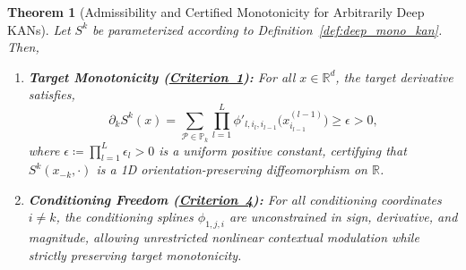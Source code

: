 \documentclass[11pt,a4paper]{article}
\theoremstyle{plain}
\newtheorem{theorem}{Theorem}[section]
\theoremstyle{definition}
\theoremstyle{remark}
\begin{document}
\begin{theorem}[Admissibility and Certified Monotonicity for Arbitrarily Deep KANs]
\label{thm:deep_kan_mono}
Let $S^k$ be parameterized according to Definition~\ref{def:deep_mono_kan}. Then,
\begin{enumerate}
    \item \textbf{Target Monotonicity (\hyperref[crit:target_monotonicity]{Criterion~1}):} For all $x \in \mathbb{R}^d$, the target derivative satisfies,
    \begin{equation}
        \partial_k S^k(x) = \sum_{\mathcal{P} \in \mathbb{P}_k} \prod_{l=1}^L \phi'_{l, i_l, i_{l-1}}\big(x^{(l-1)}_{i_{l-1}}\big) \ge \epsilon > 0,
        \label{eq:deep_kan_target_monotonicity}
    \end{equation}
    where $\epsilon \coloneqq \prod_{l=1}^L \epsilon_l > 0$ is a uniform positive constant, certifying that $S^k(x_{-k}, \cdot)$ is a 1D orientation-preserving diffeomorphism on $\mathbb{R}$.

    \item \textbf{Conditioning Freedom (\hyperref[crit:conditioning_freedom]{Criterion~4}):} For all conditioning coordinates $i \neq k$, the conditioning splines $\phi_{1, j, i}$ are unconstrained in sign, derivative, and magnitude, allowing unrestricted nonlinear contextual modulation while strictly preserving target monotonicity.
\end{enumerate}
\end{theorem}
\end{document}
